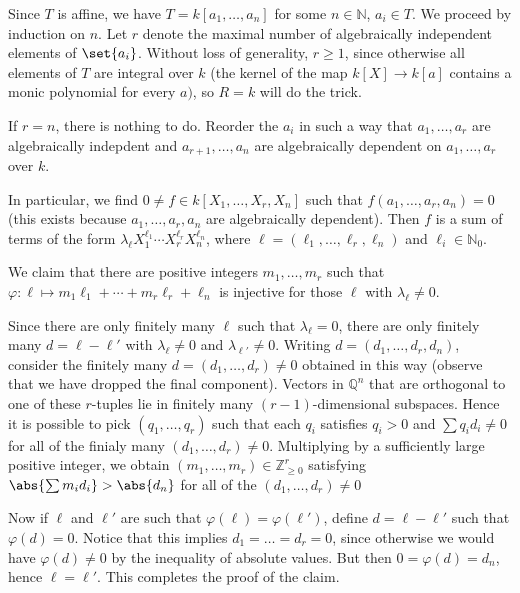 Since $T$ is affine, we have $T = k[a_1, \ldots, a_n]$ for some $n \in \mathbb{N}$,
$a_i \in T$. We proceed by induction on $n$. Let $r$ denote the maximal number
of algebraically independent elements of $\set{a_i}$. Without loss of generality, $r\geq 1$,
since otherwise all elements of $T$ are integral over $k$ (the kernel of the map
$k[X] \to k[a]$ contains a monic polynomial for every $a)$, so $R = k$ will do the
trick.

If $r = n$, there is nothing to do.
Reorder the $a_i$  in such a way that
$a_1, \ldots, a_r$ are algebraically indepdent
and $a_{r+1}, \ldots, a_n$ are algebraically dependent on $a_1, \ldots, a_r$ over
$k$.

In particular, we find $0\neq f \in k[X_1, \ldots, X_r, X_n]$ such that
$f(a_1, \ldots, a_r, a_n)= 0$ (this exists because $a_1, \ldots, a_r, a_n$ are
algebraically dependent). Then $f$ is a sum of terms of the form
$\lambda_\ell X_1^{\ell_1}\cdots X_r^{\ell_r}X_n^{\ell_n}$, where
$\ell = (\ell_1, \ldots, \ell_r, \ell_n)$ and $\ell_i \in \mathbb{N}_0$.

We claim that there are positive integers $m_1, \ldots, m_r$  such that
$\varphi\colon \ell\mapsto m_1\ell_1 + \cdots + m_r\ell_r + \ell_n$ is injective
for those $\ell$ with $\lambda_\ell \neq 0$.

Since there are only finitely many $\ell$ such that $\lambda_\ell = 0$, there
are only finitely many $d = \ell - \ell'$ with $\lambda_\ell \neq 0$ and
$\lambda_{\ell'}\neq 0$. Writing $d = (d_1, \ldots, d_r, d_n)$, consider the
finitely many $d = (d_1, \ldots, d_r)\neq 0$ obtained in this way (observe that
we have dropped the final component).
Vectors in $\mathbb{Q}^n$
that are orthogonal to one of these $r$-tuples lie in finitely many $(r-1)$-dimensional
subspaces. Hence it is possible to pick $(q_1, \ldots, q_r)$ such that each
$q_i$ satisfies $q_i > 0$ and $\sum q_id_i\neq 0$ for all of the finialy many
$(d_1, \ldots, d_r)\neq 0$. Multiplying by a sufficiently large positive integer,
we obtain
$(m_1, \ldots, m_r) \in \mathbb{Z}_{\geq 0}^r$ satisfying
$\abs{\sum m_id_i} > \abs{d_n}$ for all of the $(d_1, \ldots, d_r) \neq 0$

Now if  $\ell$ and $\ell'$ are such that $\varphi(\ell) = \varphi(\ell')$, define
$d = \ell - \ell'$ such that $\varphi(d) = 0$. Notice that this implies
$d_1 = \ldots = d_r = 0$, since otherwise we would have $\varphi(d) \neq 0$ by
the inequality of absolute values. But then $0 = \varphi(d) = d_n$, hence
$\ell = \ell'$. This completes the proof of the claim.

